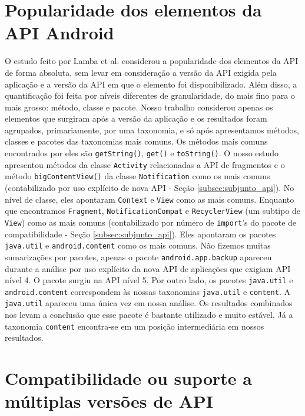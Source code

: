 \section{Popularidade dos elementos da API Android}

O estudo feito por Lamba et al. \cite{Lamba2015} considerou a popularidade dos
elementos da API de forma absoluta, sem levar em consideração a versão da API
exigida pela aplicação e a versão da API em que o elemento foi disponibilizado.
Além disso, a quantificação foi feita por níveis diferentes de granularidade, do
mais fino para o mais grosso: método, classe e pacote. Nosso trabalho considerou
apenas os elementos que surgiram após a versão da aplicação e os resultados foram
agrupados, primariamente, por uma taxonomia, e só após apresentamos métodos, classes
e pacotes das taxonomias mais comuns. Os métodos mais comuns encontrados por eles são
\texttt{getString()}, \texttt{get()} e \texttt{toString()}. O nosso estudo apresentou
métodos da classe \texttt{Activity} relacionadas a API de fragmentos e o método
\texttt{bigContentView()} da classe \texttt{Notification} como os mais comuns
(contabilizado por uso explícito de nova API - Seção \ref{subsec:subjunto_api}). No
nível de classe, eles apontaram \texttt{Context} e \texttt{View} como as mais comuns.
Enquanto que encontramos \texttt{Fragment}, \texttt{NotificationCompat} e \texttt{RecyclerView}
(um subtipo de \texttt{View}) como as mais comuns (contabilizado por número de
\texttt{import}’s do pacote de compatibilidade - Seção \ref{subsec:subjunto_api}).
Eles apontaram os pacotes \texttt{java.util} e \texttt{android.content} como os mais comuns.
Não fizemos muitas sumarizações por pacotes, apenas o pacote \texttt{android.app.backup}
apareceu durante a análise por uso explícito da nova API de aplicações que exigiam API nível
4. O pacote surgiu na API nível 5. Por outro lado, os pacotes \texttt{java.util} e
\texttt{android.content} correspondem às nossas taxonomias \texttt{java.util} e \texttt{content}.
A \texttt{java.util} apareceu uma única vez em nossa análise. Os resultados combinados nos
levam a conclusão que esse pacote é bastante utilizado e muito estável. Já a taxonomia
\texttt{content} encontra-se em um posição intermediária em nossos resultados.

\section{Compatibilidade ou suporte a múltiplas versões de API}

